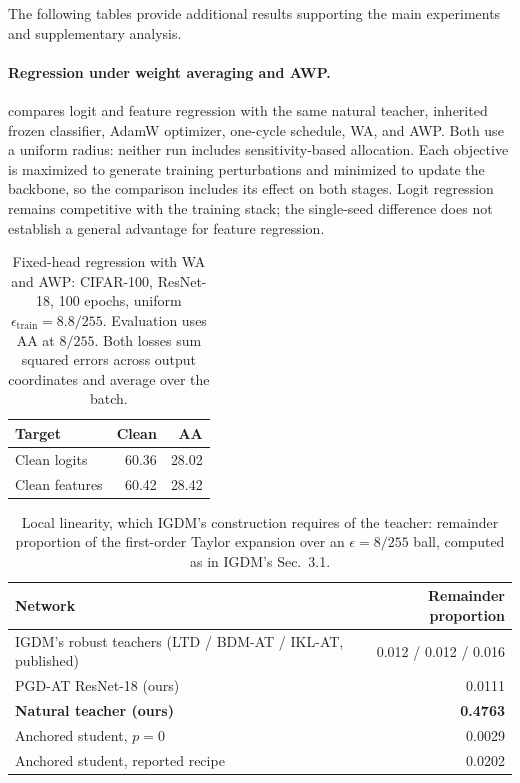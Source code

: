 The following tables provide additional results supporting the main experiments and supplementary
analysis.

\paragraph{Regression under weight averaging and AWP.}
 compares logit and feature regression with the same natural teacher,
inherited frozen classifier, AdamW optimizer, one-cycle schedule, WA, and AWP. Both use a uniform
radius: neither run includes sensitivity-based allocation. Each objective is maximized to generate
training perturbations and minimized to update the backbone, so the comparison includes its effect
on both stages. Logit regression remains competitive with the training stack; the single-seed
difference does not establish a general advantage for feature regression.

\begin{table}[!htbp]
  \centering \small \setlength{\tabcolsep}{6pt}
  \caption{Fixed-head regression with WA and AWP: CIFAR-100, ResNet-18, 100 epochs,
  uniform $\epsilon_{\mathrm{train}}=8.8/255$. Evaluation uses AA at $8/255$.
  Both losses sum squared errors across output coordinates and average over the batch.}
  \label{tab:regression_stack}
  \begin{tabular}{lrr}
    \toprule
    Target & Clean & AA \\
    \midrule
    Clean logits & 60.36 & 28.02 \\
    Clean features & 60.42 & 28.42 \\
    \bottomrule
  \end{tabular}
\end{table}

\begin{table}[!htbp]
  \centering \small \setlength{\tabcolsep}{4.5pt}
  \caption{Local linearity, which IGDM's construction requires of the teacher: remainder proportion of
  the first-order Taylor expansion over an $\epsilon=8/255$ ball, computed as in IGDM's Sec.~3.1.}
  \label{tab:linearity}
  \begin{tabular}{lr}
    \toprule
    Network & Remainder proportion \\
    \midrule
    IGDM's robust teachers (LTD / BDM-AT / IKL-AT, published) & 0.012 / 0.012 / 0.016 \\
    PGD-AT ResNet-18 (ours)          & 0.0111 \\
    \textbf{Natural teacher (ours)}  & \textbf{0.4763} \\
    Anchored student, $p=0$          & 0.0029 \\
    Anchored student, reported recipe & 0.0202 \\
    \bottomrule
  \end{tabular}
\end{table}

